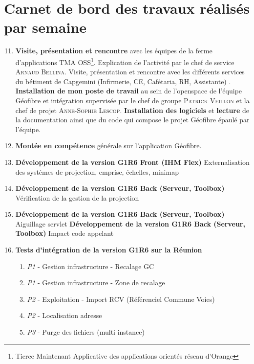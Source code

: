 \chapter{Carnet de bord des travaux réalisés par semaine}
\begin{enumerate}[label= Semaine \no\textbf{\arabic*.},itemsep=20pt]
\setcounter{enumi}{10}

\item \textbf{Visite, présentation et rencontre} avec les équipes de la ferme d'applications \textsc{TMA OSS\footnote{Tierce Maintenant Applicative des applications orientés réseau d'Orange}}. Explication de l'activité par le chef de service \textsc{Arnaud Bellina}.
\newline Visite, présentation et rencontre avec les différents services du bétiment de Capgemini (Infirmerie, CE, Cafétaria, RH, Assistante) .
\newline \textbf{Installation de mon poste de travail} au sein de l'openspace de l'équipe Géofibre et intégration supervisée par le chef de groupe \textsc{Patrick Veillon} et la chef de projet \textsc{Anne-Sophie Lescop}.
\newline \textbf{Installation des logiciels} et \textbf{lecture} de la documentation ainsi que du code qui compose le projet Géofibre épaulé par l'équipe.

\item \textbf{Montée en compétence} générale sur l'application Géofibre.
\item \textbf{Développement de la version G1R6 Front (IHM Flex)} Externalisation des systémes de projection, emprise, échelles, minimap

\item \textbf{Développement de la version G1R6 Back (Serveur, Toolbox)} Vérification de la gestion de la projection

\item \textbf{Développement de la version G1R6 Back (Serveur, Toolbox)} Aiguillage servlet
\newline \textbf{Développement de la version G1R6 Back (Serveur, Toolbox)} Impact code appelant

\item \textbf{Tests d'intégration de la version G1R6 sur la Réunion}
\begin{enumerate}[label = Tests \no\arabic*.,align=left]
\item \emph{\colorbox{rouge}{P1}} - Gestion infrastructure - Recalage GC
\item \emph{\colorbox{rouge}{P1}} - Gestion infrastructure - Zone de recalage
\item \emph{\colorbox{rouge-clair}{P2}} - Exploitation - Import RCV (Référenciel Commune Voies)
\item \emph{\colorbox{rouge-clair}{P2}} - Localisation adresse
\item \emph{\colorbox{rouge-tres-clair}{P3}} - Purge des fichiers (multi instance)
\end{enumerate}


\end{enumerate}
